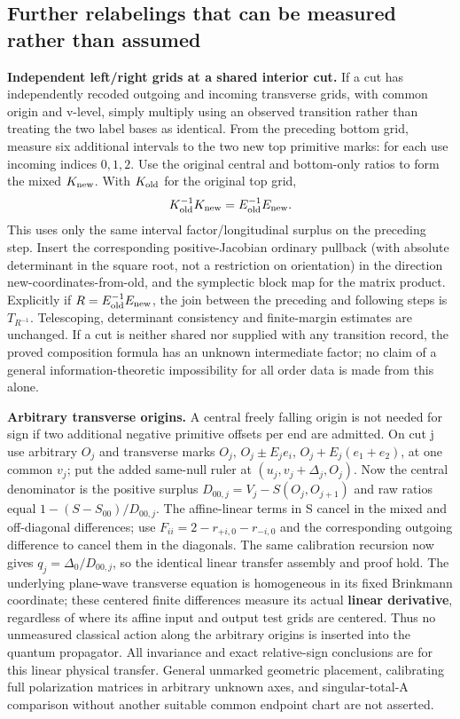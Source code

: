 \documentclass[11pt]{article}
\begin{document}
\subsection{Further relabelings that can be measured rather than assumed}\label{further-relabelings-that-can-be-measured-rather-than-assumed}

\textbf{Independent left/right grids at a shared interior cut.} If a cut has independently recoded outgoing and incoming transverse grids, with common origin and v-level, simply multiply using an observed transition rather than treating the two label bases as identical. From the preceding bottom grid, measure six additional intervals to the two new top primitive marks: for each use incoming indices \(0,1,2\). Use the original central and bottom-only ratios to form the mixed \(K_{\rm new}\). With \(K_{\rm old}\) for the original top grid,
\[
 K_{\rm old}^{-1}K_{\rm new}=E_{\rm old}^{-1}E_{\rm new}.
\]
This uses only the same interval factor/longitudinal surplus on the preceding step. Insert the corresponding positive-Jacobian ordinary pullback (with absolute determinant in the square root, not a restriction on orientation) in the direction new-coordinates-from-old, and the symplectic block map for the matrix product. Explicitly if \(R=E_{\rm old}^{-1}E_{\rm new}\), the join between the preceding and following steps is \(T_{R^{-1}}\). Telescoping, determinant consistency and finite-margin estimates are unchanged. If a cut is neither shared nor supplied with any transition record, the proved composition formula has an unknown intermediate factor; no claim of a general information-theoretic impossibility for all order data is made from this alone.

\textbf{Arbitrary transverse origins.} A central freely falling origin is not needed for sign if two additional negative primitive offsets per end are admitted. On cut j use arbitrary \(O_j\) and transverse marks \(O_j,\,O_j\pm E_je_i,\,O_j+E_j(e_1+e_2)\), at one common \(v_j\); put the added same-null ruler at \((u_j,v_j+\Delta_j,O_j)\). Now the central denominator is the positive surplus \(D_{00,j}=V_j-S(O_j,O_{j+1})\) and raw ratios equal \(1-(S-S_{00})/D_{00,j}\). The affine-linear terms in S cancel in the mixed and off-diagonal differences; use \(F_{ii}=2-r_{+i,0}-r_{-i,0}\) and the corresponding outgoing difference to cancel them in the diagonals. The same calibration recursion now gives \(q_j=\Delta_0/D_{00,j}\), so the identical linear transfer assembly and proof hold. The underlying plane-wave transverse equation is homogeneous in its fixed Brinkmann coordinate; these centered finite differences measure its actual \textbf{linear derivative}, regardless of where its affine input and output test grids are centered. Thus no unmeasured classical action along the arbitrary origins is inserted into the quantum propagator. All invariance and exact relative-sign conclusions are for this linear physical transfer. General unmarked geometric placement, calibrating full polarization matrices in arbitrary unknown axes, and singular-total-A comparison without another suitable common endpoint chart are not asserted.
\end{document}
